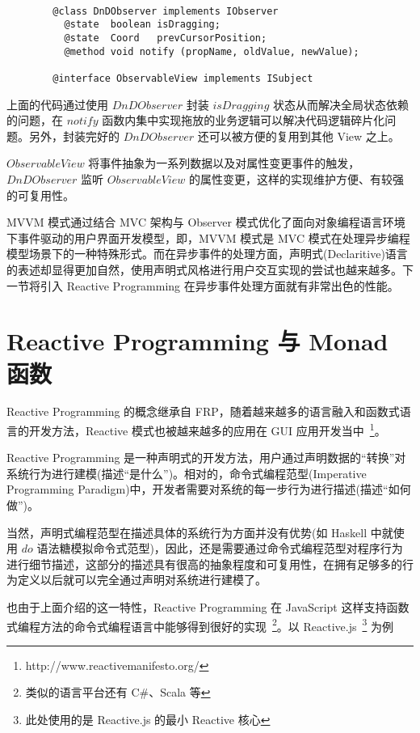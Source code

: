 \begin{verbatim}

        @class DnDObserver implements IObserver
          @state  boolean isDragging;
          @state  Coord   prevCursorPosition;
          @method void notify (propName, oldValue, newValue);

        @interface ObservableView implements ISubject

\end{verbatim}

上面的代码通过使用 $DnDObserver$ 封装 $isDragging$ 状态从而解决全局状态依赖的问题，在 $notify$ 函数内集中实现拖放的业务逻辑可以解决代码逻辑碎片化问题。另外，封装完好的 $DnDObserver$ 还可以被方便的复用到其他 View 之上。

$ObservableView$ 将事件抽象为一系列数据以及对属性变更事件的触发，$DnDObserver$ 监听 $ObservableView$ 的属性变更，这样的实现维护方便、有较强的可复用性。

MVVM 模式通过结合 MVC 架构与 Observer 模式优化了面向对象编程语言环境下事件驱动的用户界面开发模型，即，MVVM 模式是 MVC 模式在处理异步编程模型场景下的一种特殊形式。而在异步事件的处理方面，声明式(Declaritive)语言的表述却显得更加自然，使用声明式风格进行用户交互实现的尝试也越来越多。下一节将引入 Reactive Programming 在异步事件处理方面就有非常出色的性能。

\section{Reactive Programming 与 Monad 函数}

Reactive Programming 的概念继承自 FRP，随着越来越多的语言融入和函数式语言的开发方法，Reactive 模式也被越来越多的应用在 GUI 应用开发当中~\footnote{http://www.reactivemanifesto.org/}。

Reactive Programming 是一种声明式的开发方法，用户通过声明数据的“转换”对系统行为进行建模(描述“是什么”)。相对的，命令式编程范型(Imperative Programming Paradigm)中，开发者需要对系统的每一步行为进行描述(描述“如何做”)。

当然，声明式编程范型在描述具体的系统行为方面并没有优势(如 Haskell 中就使用 $do$ 语法糖模拟命令式范型)，因此，还是需要通过命令式编程范型对程序行为进行细节描述，这部分的描述具有很高的抽象程度和可复用性，在拥有足够多的行为定义以后就可以完全通过声明对系统进行建模了。

也由于上面介绍的这一特性，Reactive Programming 在 JavaScript 这样支持函数式编程方法的命令式编程语言中能够得到很好的实现~\footnote{类似的语言平台还有 C\#、Scala 等}。以 Reactive.js~\footnote{此处使用的是 Reactive.js 的最小 Reactive 核心} 为例~\cite{Carkci2013}

